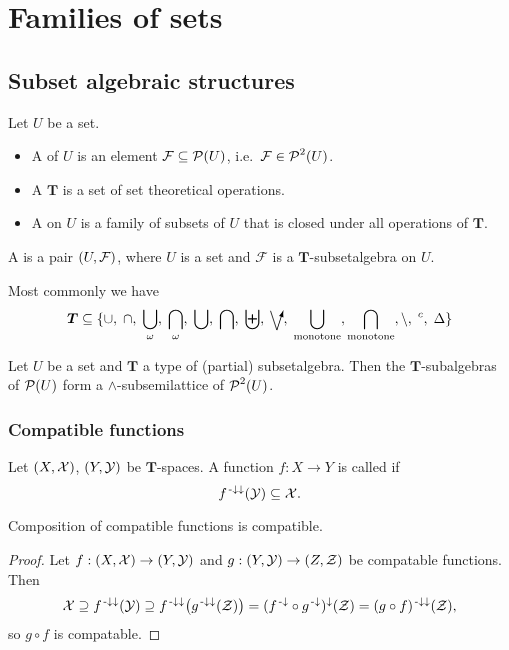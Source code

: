 \section{Families of sets}
\subsection{Subset algebraic structures}
\begin{definition}
Let $U$ be a set.
\begin{itemize}
\item A  of $U$ is an element $\mathcal{F}\subseteq\operatorname{\mathcal{P}}(U)$, i.e.\ $\mathcal{F}\in\operatorname{\mathcal{P}}^2(U)$.
\item A  $\boldsymbol{T}$ is a set of set theoretical operations.
\item A  on $U$ is a family of subsets of $U$ that is closed under all operations of $\boldsymbol{T}$.
\end{itemize}
A  is a pair $\sSet{U,\mathcal{F}}$, where $U$ is a set and $\mathcal{F}$ is a $\boldsymbol{T}$-subsetalgebra on $U$.
\end{definition}
Most commonly we have
\[ \boldsymbol{T} \subseteq \{\cup,\; \cap,\; \bigcup_\omega,\; \bigcap_\omega,\; \bigcup,\; \bigcap,\; \biguplus,\; \dirvee,\; \bigcup_\text{monotone}, \bigcap_\text{monotone}, \setminus,\; ^c,\; \symdiff \} \]

\begin{proposition}
Let $U$ be a set and $\boldsymbol{T}$ a type of (partial) subsetalgebra. Then the $\boldsymbol{T}$-subalgebras of $\operatorname{\mathcal{P}}(U)$ form a $\wedge$-subsemilattice of $\operatorname{\mathcal{P}}^2(U)$.
\end{proposition}

\subsubsection{Compatible functions}
\begin{definition}
Let $\sSet{X, \mathcal{X}}$, $\sSet{Y, \mathcal{Y}}$ be $\boldsymbol{T}$-spaces. A function $f: X\to Y$ is called  if
\[ f^{{\text{\hspace{0.15em}-}\downarrow}\downarrow}(\mathcal{Y}) \subseteq \mathcal{X}. \]
\end{definition}

\begin{proposition} \label{compositionCompatibleFunctions}
Composition of compatible functions is compatible.
\end{proposition}
\begin{proof}
Let $f: \sSet{X,\mathcal{X}} \to \sSet{Y,\mathcal{Y}}$ and $g: \sSet{Y,\mathcal{Y}} \to \sSet{Z,\mathcal{Z}}$ be compatable functions. Then
\[ \mathcal{X} \supseteq f^{{\text{\hspace{0.15em}-}\downarrow}\downarrow}(\mathcal{Y}) \supseteq f^{{\text{\hspace{0.15em}-}\downarrow}\downarrow}\big(g^{{\text{\hspace{0.15em}-}\downarrow}\downarrow}(\mathcal{Z})\big) = (f^{{\text{\hspace{0.15em}-}\downarrow}} \circ g^{{\text{\hspace{0.15em}-}\downarrow}})^{\downarrow}(\mathcal{Z}) = (g\circ f)^{{\text{\hspace{0.15em}-}\downarrow}\downarrow}(\mathcal{Z}), \]
so $g \circ f$ is compatable.
\end{proof}

